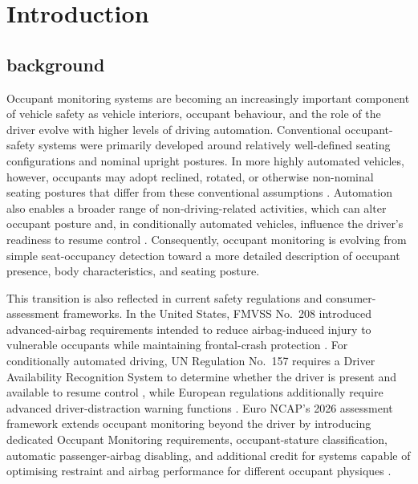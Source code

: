 \chapter{Introduction}
\label{ch:introduction}


\section{background}
\label{sec:background}

Occupant monitoring systems are becoming an increasingly important component of vehicle safety as vehicle interiors, 
occupant behaviour, and the role of the driver evolve with higher levels of driving automation. Conventional 
occupant-safety systems were primarily developed around relatively well-defined seating configurations and 
nominal upright postures. In more highly automated vehicles, however, occupants may adopt reclined, rotated, 
or otherwise non-nominal seating postures that differ from these conventional assumptions \cite{mcmurry2018oop}. 
Automation also enables a broader range of non-driving-related activities, which can alter occupant posture and, 
in conditionally automated vehicles, influence the driver's readiness to resume control \cite{zhao2024takeover}. 
Consequently, occupant monitoring is evolving from simple seat-occupancy detection toward a more detailed description 
of occupant presence, body characteristics, and seating posture.

This transition is also reflected in current safety regulations and consumer-assessment frameworks. In the United States, 
FMVSS No.~208 introduced advanced-airbag requirements intended to reduce airbag-induced injury to vulnerable occupants
while maintaining frontal-crash protection \cite{fmvss208}. For conditionally automated driving, UN Regulation No.~157 
requires a Driver Availability Recognition System to determine whether the driver is present and available to resume 
control \cite{uneceR157}, while European regulations additionally require advanced driver-distraction warning functions 
\cite{eu2023addw}. Euro NCAP's 2026 assessment framework extends occupant monitoring beyond the driver by introducing 
dedicated Occupant Monitoring requirements, occupant-stature classification, automatic passenger-airbag disabling, and 
additional credit for systems capable of optimising restraint and airbag performance for different occupant physiques 
\cite{euroncap2026}.

